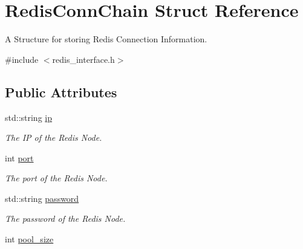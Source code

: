 \hypertarget{structRedisConnChain}{\section{Redis\-Conn\-Chain Struct Reference}
\label{structRedisConnChain}
}


A Structure for storing Redis Connection Information.  




{\ttfamily \#include $<$redis\-\_\-interface.\-h$>$}

\subsection*{Public Attributes}
\begin{DoxyCompactItemize}
\item 
\hypertarget{structRedisConnChain_a4694dc63aa9ea1864ddd3bd32324a517}{std\-::string \hyperlink{structRedisConnChain_a4694dc63aa9ea1864ddd3bd32324a517}{ip}}\label{structRedisConnChain_a4694dc63aa9ea1864ddd3bd32324a517}

\begin{DoxyCompactList}\small\item\em The I\-P of the Redis Node. \end{DoxyCompactList}\item 
\hypertarget{structRedisConnChain_a5cc9c60a354a6519ab6738a97a30acf9}{int \hyperlink{structRedisConnChain_a5cc9c60a354a6519ab6738a97a30acf9}{port}}\label{structRedisConnChain_a5cc9c60a354a6519ab6738a97a30acf9}

\begin{DoxyCompactList}\small\item\em The port of the Redis Node. \end{DoxyCompactList}\item 
\hypertarget{structRedisConnChain_a8bbae840be9aab68e4c98f813915b44c}{std\-::string \hyperlink{structRedisConnChain_a8bbae840be9aab68e4c98f813915b44c}{password}}\label{structRedisConnChain_a8bbae840be9aab68e4c98f813915b44c}

\begin{DoxyCompactList}\small\item\em The password of the Redis Node. \end{DoxyCompactList}\item 
\hypertarget{structRedisConnChain_a9d8d3258596c3de62a7a71207df2617f}{int \hyperlink{structRedisConnChain_a9d8d3258596c3de62a7a71207df2617f}{pool\-\_\-size}}\label{structRedisConnChain_a9d8d3258596c3de62a7a71207df2617f}


\end{DoxyCompactItemize}
